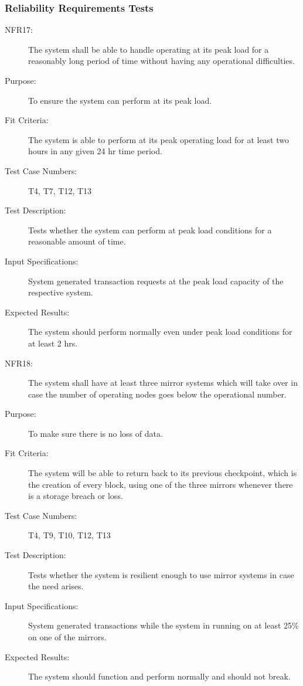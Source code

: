 \documentclass[a4paper,twoside,phd]{BYUPhys}
\begin{document}
\subsubsection{Reliability Requirements Tests}
\begin{description}
\item[NFR17:] The system shall be able to handle operating at its peak load for a reasonably long period of time without having any operational difficulties.
\item[Purpose:] To ensure the system can perform at its peak load.
\item[Fit Criteria:] The system is able to perform at its peak operating load for at least two hours in any given 24 hr time period.
\item[Test Case Numbers:] T4, T7, T12, T13
\item[Test Description:] Tests whether the system can perform at peak load conditions for a reasonable amount of time.
\item[Input Specifications:] System generated transaction requests at the peak load capacity of the respective system.
\item[Expected Results:] The system should perform normally even under peak load conditions for at least 2 hrs.

\item[NFR18:] The system shall have at least three mirror systems which will take over in case the number of operating nodes goes below the operational number.
\item[Purpose:] To make sure there is no loss of data.
\item[Fit Criteria:] The system will be able to return back to its previous checkpoint, which is the creation of every block, using one of the three mirrors whenever there is a storage breach or loss.
\item[Test Case Numbers:] T4, T9, T10, T12, T13
\item[Test Description:] Tests whether the system is resilient enough to use mirror systems in case the need arises.
\item[Input Specifications:] System generated transactions while the system in running on at least 25\% on one of the mirrors.
\item[Expected Results:] The system should function and perform normally and should not break.


\end{description}
\end{document}
